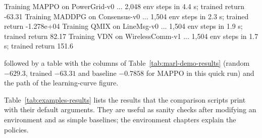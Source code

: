 \begin{textcode}
Training MAPPO on PowerGrid-v0 ...
  2,048 env steps in 4.4 s; trained return -63.31
Training MADDPG on Consensus-v0 ...
  1,504 env steps in 2.3 s; trained return -1.278e+04
Training QMIX on LineMsg-v0 ...
  1,504 env steps in 1.9 s; trained return 82.17
Training VDN on WirelessComm-v1 ...
  1,504 env steps in 1.7 s; trained return 151.6
\end{textcode}

followed by a table with the columns of Table~\ref{tab:marl-demo-results}
(random $-629.3$, trained $-63.31$ and baseline $-0.7858$ for MAPPO in this
quick run) and the path of the learning-curve figure.

Table~\ref{tab:examples-results} lists the results that the comparison
scripts print with their default arguments. They are useful as sanity checks
after modifying an environment and as simple baselines; the environment
chapters explain the policies.

